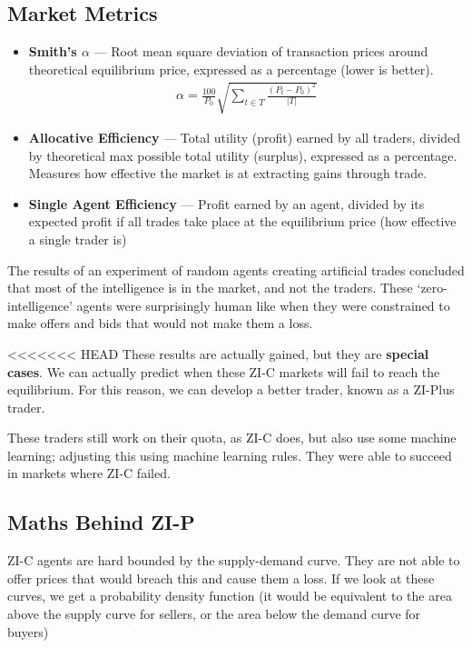 \documentclass[11pt,a4paper,titlepage,dvipsnames,cmyk]{scrartcl}
\begin{document}
\subsection{Market Metrics}
\begin{itemize}
    \item \textbf{Smith's $\alpha$} --- Root mean square deviation of transaction prices around theoretical equilibrium price, expressed as a percentage (lower is better).
    \begin{align*}
    \alpha = \frac{100}{P_0} \sqrt{\sum_{t \in T} \frac{(P_t - P_0)^2}{|T|}}
    \end{align*}
    \item \textbf{Allocative Efficiency} --- Total utility (profit) earned by all traders, divided by theoretical max possible total utility (surplus), expressed as a percentage. Measures how effective the market is at extracting gains through trade.
    \item \textbf{Single Agent Efficiency} --- Profit earned by an agent, divided by its expected profit if all trades take place at the equilibrium price (how effective a single trader is)
\end{itemize}

The results of an experiment of random agents creating artificial trades concluded that most of the intelligence is in the market, and not the traders. These `zero-intelligence' agents were surprisingly human like when they were constrained to make offers and bids that would not make them a loss.

<<<<<<< HEAD
These results are actually gained, but they are \textbf{special cases}. We can actually predict when these ZI-C markets will fail to reach the equilibrium. For this reason, we can develop a better trader, known as a ZI-Plus trader.

These traders still work on their quota, as ZI-C does, but also use some machine learning; adjusting this using machine learning rules. They were able to succeed in markets where ZI-C failed.

\subsection{Maths Behind ZI-P}
ZI-C agents are hard bounded by the supply-demand curve. They are not able to offer prices that would breach this and cause them a loss. If we look at these curves, we get a probability density function (it would be equivalent to the area above the supply curve for sellers, or the area below the demand curve for buyers)
\end{document}
